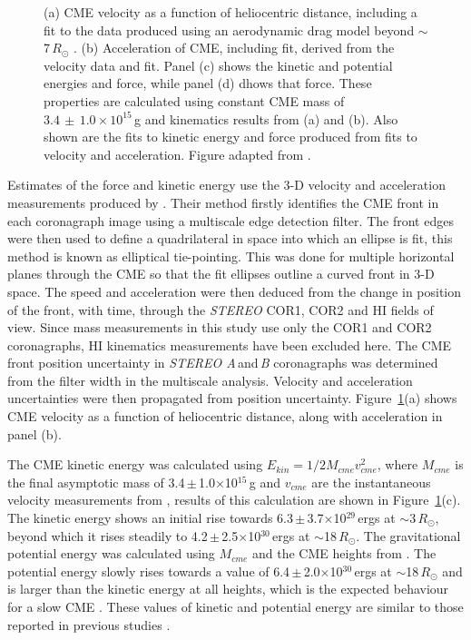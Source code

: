 \begin{figure}[t!]
\begin{center}
\caption[CME kinematics and energetics as a function of height]{{\color{black}(a) CME velocity as a function of heliocentric distance, including a fit to the data produced using an aerodynamic drag model beyond $\sim$7\,$R_{\odot}$ \citep{byrne2010}. (b) Acceleration of CME, including fit,  derived from the velocity data and fit. 
Panel (c) shows the kinetic and potential energies and force, while panel (d) dhows that force. These properties are calculated using constant CME mass of $3.4\,\pm\,1.0\times10^{15}$\,g and kinematics results from (a) and (b). Also shown are the fits to kinetic energy and force produced from fits to velocity and acceleration. Figure adapted from \citet{carley2012}.}}
\label{fig:force_20081212}
\end{center}
\end{figure}
Estimates of the force and kinetic energy use the 3-D velocity and acceleration measurements produced by \citet{byrne2010}. Their method firstly identifies the CME front in each coronagraph image using a multiscale edge detection filter. The front edges were then used to define a quadrilateral in space into which an ellipse is fit, this method is known as elliptical tie-pointing. This was done for multiple horizontal planes through the CME so that the fit ellipses outline a curved front in 3-D space. The speed and acceleration were then deduced from the change in position of the front, with time, through the \emph{STEREO} COR1, COR2 and HI fields of view. Since mass measurements in this study use only the COR1 and COR2 coronagraphs, HI kinematics measurements have been excluded here. The CME front position uncertainty in \emph{STEREO A}\,and\,\emph{B} coronagraphs was determined from the filter width in the multiscale analysis. Velocity and acceleration uncertainties were then propagated from position uncertainty.  Figure~\ref{fig:force_20081212}(a) shows CME velocity as a function of heliocentric distance, along with acceleration in panel (b). 


The CME kinetic energy was calculated using $E_{kin}=1/2M_{cme}v_{cme}^{2}$, where $M_{cme}$ is the final asymptotic mass of 3.4\,$\pm$\,1.0$\times$10$^{15}$\,g and $v_{cme}$ are the instantaneous velocity measurements from \citet{byrne2010}, results of this calculation are shown in Figure~\ref{fig:force_20081212}(c). The kinetic energy shows 
an initial rise towards 6.3\,$\pm$\,3.7$\times$10$^{29}$\,ergs at $\sim$3\,$R_{\odot}$, beyond which it rises steadily to 4.2\,$\pm$\,2.5$\times$10$^{30}$\,ergs at $\sim$18\,$R_{\odot}$. The gravitational potential energy was calculated using $M_{cme}$ and the CME heights from \citet{byrne2010}. The potential energy slowly rises towards a value of 6.4\,$\pm$\,2.0$\times$10$^{30}$\,ergs at $\sim$18\,$R_{\odot}$ and is larger than the kinetic energy at all heights, which is the expected behaviour for a slow CME \citep{vou00}. These values of kinetic and potential energy are similar to those reported in previous studies \citep{emslie2004, vour2010}. 

